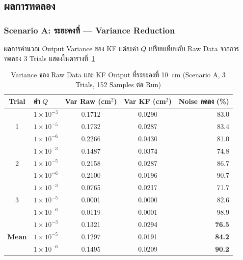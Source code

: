 
\subsection{ผลการทดลอง}

\subsubsection{Scenario A: ระยะคงที่ --- Variance Reduction}

ผลการคำนวณ Output Variance ของ KF แต่ละค่า $Q$ เปรียบเทียบกับ Raw Data
จากการทดลอง 3 Trials แสดงในตารางที่~\ref{tab:exp3_scA_variance}

\begin{table}[htbp]
    \centering
    \caption{Variance ของ Raw Data และ KF Output ที่ระยะคงที่ 10~cm
             (Scenario A, 3 Trials, 152 Samples ต่อ Run)}
    \label{tab:exp3_scA_variance}
    \begin{tabular}{clccr}
        \hline
        \textbf{Trial}
            & \textbf{ค่า $Q$}
            & \textbf{Var Raw (cm$^2$)}
            & \textbf{Var KF (cm$^2$)}
            & \textbf{Noise ลดลง (\%)} \\
        \hline
        \multirow{3}{*}{1}
            & $1\times10^{-3}$ & 0.1712 & 0.0290 & 83.0 \\
            & $1\times10^{-5}$ & 0.1732 & 0.0287 & 83.4 \\
            & $1\times10^{-6}$ & 0.2266 & 0.0430 & 81.0 \\
        \hline
        \multirow{3}{*}{2}
            & $1\times10^{-3}$ & 0.1487 & 0.0374 & 74.8 \\
            & $1\times10^{-5}$ & 0.2158 & 0.0287 & 86.7 \\
            & $1\times10^{-6}$ & 0.2100 & 0.0196 & 90.7 \\
        \hline
        \multirow{3}{*}{3}
            & $1\times10^{-3}$ & 0.0765 & 0.0217 & 71.7 \\
            & $1\times10^{-5}$ & 0.0001 & 0.0000 & 82.6 \\
            & $1\times10^{-6}$ & 0.0119 & 0.0001 & 98.9 \\
        \hline
        \multirow{3}{*}{\textbf{Mean}}
            & $1\times10^{-3}$ & 0.1321 & 0.0294 & \textbf{76.5} \\
            & $1\times10^{-5}$ & 0.1297 & 0.0191 & \textbf{84.2} \\
            & $1\times10^{-6}$ & 0.1495 & 0.0209 & \textbf{90.2} \\
        \hline
    \end{tabular}
\end{table}
 
